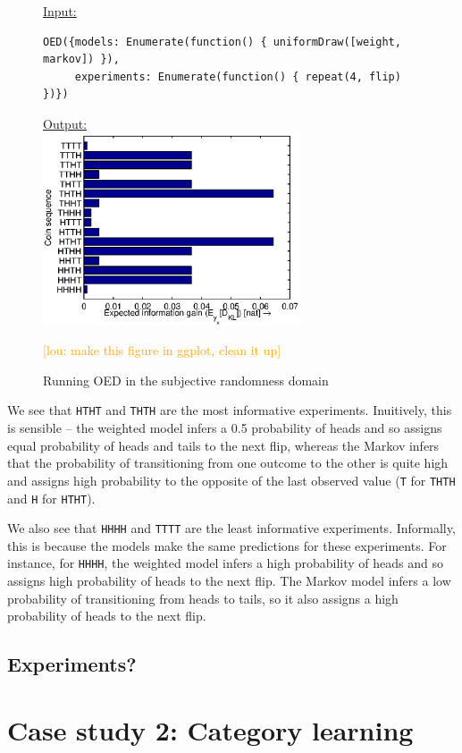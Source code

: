 \documentclass{article}
\newcommand{\lou}[1]{\textcolor{orange}{[lou: #1]}}
\begin{document}
\begin{figure}[h!]
\underline{\textsf{Input:}}
\begin{lstlisting}
OED({models: Enumerate(function() { uniformDraw([weight, markov]) }),
     experiments: Enumerate(function() { repeat(4, flip) })})
\end{lstlisting}

\underline{\textsf{Output:}}\\
\includegraphics[width=3in]{img/coin.eps}
\caption{Running OED in the subjective randomness domain}
\lou{make this figure in ggplot, clean it up}
\label{fig:run-coin}
\end{figure}

We see that \lstinline{HTHT} and \lstinline{THTH} are the most informative experiments.
Inuitively, this is sensible -- the weighted model infers a 0.5 probability of heads and so assigns equal probability of heads and tails to the next flip, whereas the Markov infers that the probability of transitioning from one outcome to the other is quite high and assigns high probability to the opposite of the last observed value (\lstinline{T} for \lstinline{THTH} and \lstinline{H} for \lstinline{HTHT}).

We also see that \lstinline{HHHH} and \lstinline{TTTT} are the least informative experiments.
Informally, this is because the models make the same predictions for these experiments.
For instance, for \lstinline{HHHH}, the weighted model infers a high probability of heads and so assigns high probability of heads to the next flip.
The Markov model infers a low probability of transitioning from heads to tails, so it also assigns a high probability of heads to the next flip.

\subsection{Experiments?}


\section{Case study 2: Category learning}
\end{document}
